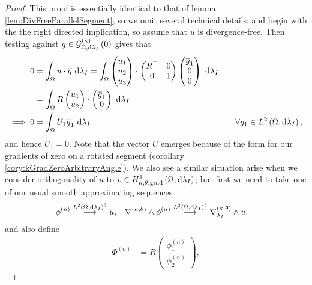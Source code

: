 \begin{proof}
	This proof is essentially identical to that of lemma \ref{lem:DivFreeParallelSegment}, so we omit several technical details; and begin with the the right directed implication, so assume that $u$ is divergence-free.
	Then testing against $g\in\mathcal{G}_{ \Omega, \mathrm{d}\lambda_I}^{(\kappa)}\left( 0 \right)$ gives that 
	\begin{align*}
		0 &= \int_{\Omega} u\cdot \overline{g} \ \mathrm{d}\lambda_I
		= \int_{\Omega} \begin{pmatrix} u_1 \\ u_2 \\ u_3 \end{pmatrix} \cdot \begin{pmatrix} R^{\top} & 0 \\ 0 & 1 \end{pmatrix} \begin{pmatrix} \overline{g}_1 \\ 0 \\ 0 \end{pmatrix}  \ \mathrm{d}\lambda_I \\
		&= \int_{\Omega} R\begin{pmatrix} u_1 \\ u_2 \end{pmatrix} \cdot \begin{pmatrix} \overline{g}_1 \\ 0 \end{pmatrix}  \ \mathrm{d}\lambda_I \\
		\implies 0 &= \int_{\Omega} U_1 \overline{g}_1  \ \mathrm{d}\lambda_I &\quad \forall g_1\in L^{2}\left( \Omega,\mathrm{d}\lambda_I \right),
	\end{align*}
	and hence $U_1=0$.
	Note that the vector $U$ emerges because of the form for our gradients of zero on a rotated segment (corollary \ref{cory:kGradZeroArbitraryAngle}).
	We also see a similar situation arise when we consider orthogonality of $u$ to $v\in H^1_{\kappa,\theta,\mathrm{grad}}\left( \Omega, \mathrm{d}\lambda_I \right)$; but first we need to take one of our usual smooth approximating sequences
	\begin{align*}
	\phi^{(n)} \overset{L^{2}\left( \Omega,\mathrm{d}\lambda_I \right)^3}{\longrightarrow} u, 
	&\quad \nabla_{}^{\left( \kappa, \theta \right)}\wedge\phi^{(n)} \overset{L^{2}\left( \Omega,\mathrm{d}\lambda_I \right)^3}{\longrightarrow} \nabla_{\lambda_I}^{\left( \kappa, \theta \right)}\wedge u.
	\end{align*}
	and also define
	\begin{align*}
		\Phi^{(n)} &= R\begin{pmatrix} \phi_1^{(n)} \\ \phi_2^{(n)} \end{pmatrix}, 
	\end{align*}

\end{proof}
